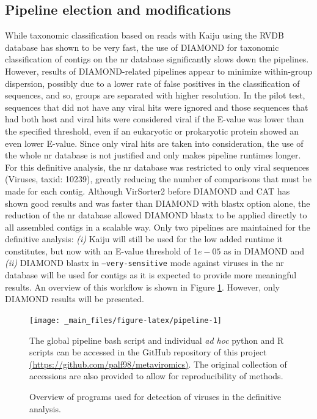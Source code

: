 \documentclass[
  openany]{book}
\begin{document}
\hypertarget{pipeline-election-and-modifications}{%
\subsection{Pipeline election and modifications}\label{pipeline-election-and-modifications}}

While taxonomic classification based on reads with Kaiju using the RVDB database has shown to be very fast, the use of DIAMOND for taxonomic classification of contigs on the nr database significantly slows down the pipelines. However, results of DIAMOND-related pipelines appear to minimize within-group dispersion, possibly due to a lower rate of false positives in the classification of sequences, and so, groups are separated with higher resolution. In the pilot test, sequences that did not have any viral hits were ignored and those sequences that had both host and viral hits were considered viral if the E-value was lower than the specified threshold, even if an eukaryotic or prokaryotic protein showed an even lower E-value. Since only viral hits are taken into consideration, the use of the whole nr database is not justified and only makes pipeline runtimes longer. For this definitive analysis, the nr database was restricted to only viral sequences (Viruses, taxid: 10239), greatly reducing the number of comparisons that must be made for each contig. Although VirSorter2 before DIAMOND and CAT has shown good results and was faster than DIAMOND with blastx option alone, the reduction of the nr database allowed DIAMOND blastx to be applied directly to all assembled contigs in a scalable way. Only two pipelines are maintained for the definitive analysis: \emph{(i)} Kaiju will still be used for the low added runtime it constitutes, but now with an E-value threshold of \(1e-05\) as in DIAMOND and \emph{(ii)} DIAMOND blastx in \texttt{--very-sensitive} mode against viruses in the nr database will be used for contigs as it is expected to provide more meaningful results. An overview of this workflow is shown in Figure \ref{fig:pipeline}. However, only DIAMOND results will be presented.

\begin{figure}[!htbp]

\begin{center}\texttt{[image: \_main\_files/figure-latex/pipeline-1]} \end{center}

\caption{Overview of programs used for detection of viruses in the definitive analysis. \label{fig:pipeline}}
The global pipeline bash script and individual \emph{ad hoc} python and R scripts can be accessed in the GitHub repository of this project \href{https://github.com/palf98/metaviromics}{(https://github.com/palf98/metaviromics)}. The original collection of accessions are also provided to allow for reproducibility of methods.
\end{figure}
\end{document}
